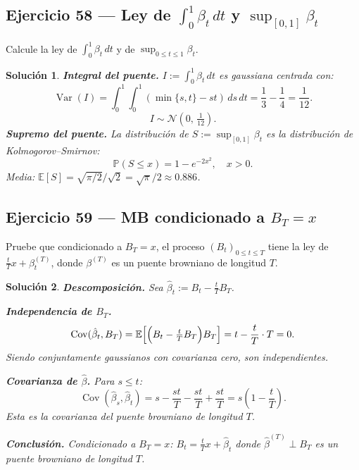 \documentclass[12pt,letterpaper]{article}
\theoremstyle{ejercicio}
\theoremstyle{solucion}
\newtheorem*{solucion}{Solución}
\newcommand{\E}{\mathbb{E}}
\newcommand{\Var}{\operatorname{Var}}
\newcommand{\Cov}{\operatorname{Cov}}
\renewcommand{\P}{\mathbb{P}}
\begin{document}
\subsection*{Ejercicio 58 — Ley de $\int_0^1\beta_t\,dt$ y $\sup_{[0,1]}\beta_t$}

\begin{recuadro}
Calcule la ley de $\int_0^1\beta_t\,dt$ y de $\sup_{0\le t\le 1}\beta_t$.
\end{recuadro}

\begin{solucion}
\textbf{Integral del puente.} $I:=\int_0^1\beta_t\,dt$ es gaussiana centrada con:
\[
  \Var(I)=\int_0^1\int_0^1(\min\{s,t\}-st)\,ds\,dt=\frac{1}{3}-\frac{1}{4}=\frac{1}{12}.
\]
\[
  \boxed{I\sim\mathcal{N}\!\left(0,\,\tfrac{1}{12}\right).}
\]
\textbf{Supremo del puente.} La distribución de $S:=\sup_{[0,1]}\beta_t$ es la
distribución de Kolmogorov--Smirnov:
\[
  \P(S\le x)=1-e^{-2x^2},\quad x>0.
\]
Media: $\E[S]=\sqrt{\pi/2}/\sqrt{2}=\sqrt{\pi}/2\approx 0.886$.
\end{solucion}

\subsection*{Ejercicio 59 — MB condicionado a $B_T=x$}

\begin{recuadro}
Pruebe que condicionado a $B_T=x$, el proceso $(B_t)_{0\le t\le T}$ tiene la ley de
$\frac{t}{T}x+\beta_t^{(T)}$, donde $\beta^{(T)}$ es un puente browniano de longitud $T$.
\end{recuadro}

\begin{solucion}
\textbf{Descomposición.} Sea $\hat\beta_t:=B_t-\frac{t}{T}B_T$.

\textbf{Independencia de $B_T$.}
\[
  \Cov(\hat\beta_t,B_T)=\E\!\left[\Bigl(B_t-\tfrac{t}{T}B_T\Bigr)B_T\right]=t-\frac{t}{T}\cdot T=0.
\]
Siendo conjuntamente gaussianos con covarianza cero, son independientes.

\textbf{Covarianza de $\hat\beta$.} Para $s\le t$:
\[
  \Cov(\hat\beta_s,\hat\beta_t)=s-\frac{st}{T}-\frac{st}{T}+\frac{st}{T}=s\!\left(1-\frac{t}{T}\right).
\]
Esta es la covarianza del puente browniano de longitud $T$.

\textbf{Conclusión.} Condicionado a $B_T=x$: $B_t=\frac{t}{T}x+\hat\beta_t$
donde $\hat\beta^{(T)}\perp B_T$ es un puente browniano de longitud $T$.
\end{solucion}
\end{document}
